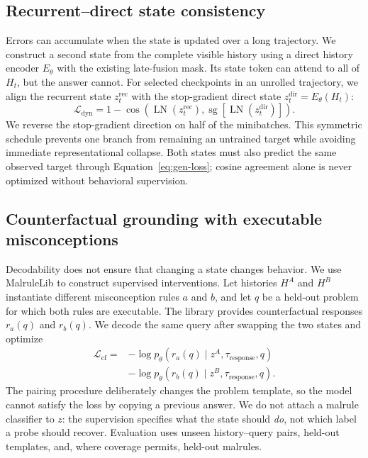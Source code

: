 \subsection{Recurrent--direct state consistency}

Errors can accumulate when the state is updated over a long trajectory.  We
construct a second state from the complete visible history using a direct
history encoder $E_\theta$ with the existing late-fusion mask.  Its state token
can attend to all of $H_t$, but the answer cannot.  For selected checkpoints in
an unrolled trajectory, we align the recurrent state $z_t^{\mathrm{rec}}$ with
the stop-gradient direct state $z_t^{\mathrm{dir}}=E_\theta(H_t)$:
\begin{equation}
    \mathcal L_{\mathrm{dyn}}
      =1-\cos\!\left(
        \operatorname{LN}(z_t^{\mathrm{rec}}),
        \operatorname{sg}[\operatorname{LN}(z_t^{\mathrm{dir}})]
      \right).
    \label{eq:dyn-loss}
\end{equation}
We reverse the stop-gradient direction on half of the minibatches.  This
symmetric schedule prevents one branch from remaining an untrained target
while avoiding immediate representational collapse.  Both states must also
predict the same observed target through Equation~\ref{eq:gen-loss}; cosine
agreement alone is never optimized without behavioral supervision.

\subsection{Counterfactual grounding with executable misconceptions}

Decodability does not ensure that changing a state changes behavior.  We use
MalruleLib to construct supervised interventions.  Let histories $H^A$ and
$H^B$ instantiate different misconception rules $a$ and $b$, and let $q$ be a
held-out problem for which both rules are executable.  The library provides
counterfactual responses $r_a(q)$ and $r_b(q)$.  We decode the same query after
swapping the two states and optimize
\begin{align}
    \mathcal L_{\mathrm{cf}} ={}&
    -\log p_\theta(r_a(q)\mid z^A,\tau_{\mathrm{response}},q) \\
    &-\log p_\theta(r_b(q)\mid z^B,\tau_{\mathrm{response}},q).
    \label{eq:cf-loss}
\end{align}
The pairing procedure deliberately changes the problem template, so the model
cannot satisfy the loss by copying a previous answer.  We do not attach a
malrule classifier to $z$: the supervision specifies what the state should
\emph{do}, not which label a probe should recover.  Evaluation uses unseen
history--query pairs, held-out templates, and, where coverage permits, held-out
malrules.


